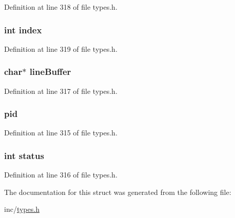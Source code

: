 Definition at line 318 of file types.h.

\hypertarget{structdata_slot_shell_a750b5d744c39a06bfb13e6eb010e35d0}{
\subsubsection[{index}]{\setlength{\rightskip}{0pt plus 5cm}int {\bf index}}}
\label{structdata_slot_shell_a750b5d744c39a06bfb13e6eb010e35d0}


Definition at line 319 of file types.h.

\hypertarget{structdata_slot_shell_ae8b496c8abc98d4ba2e5f3d7992c93b7}{
\subsubsection[{lineBuffer}]{\setlength{\rightskip}{0pt plus 5cm}char$\ast$ {\bf lineBuffer}}}
\label{structdata_slot_shell_ae8b496c8abc98d4ba2e5f3d7992c93b7}


Definition at line 317 of file types.h.

\hypertarget{structdata_slot_shell_ae0d46a978d5cd6707411f276ad869b9c}{
\subsubsection[{pid}]{ {\bf pid}}}
\label{structdata_slot_shell_ae0d46a978d5cd6707411f276ad869b9c}


Definition at line 315 of file types.h.

\hypertarget{structdata_slot_shell_a6e27f49150e9a14580fb313cc2777e00}{
\subsubsection[{status}]{\setlength{\rightskip}{0pt plus 5cm}int {\bf status}}}
\label{structdata_slot_shell_a6e27f49150e9a14580fb313cc2777e00}


Definition at line 316 of file types.h.



The documentation for this struct was generated from the following file:\begin{DoxyCompactItemize}
\item 
inc/\hyperlink{types_8h}{types.h}\end{DoxyCompactItemize}
